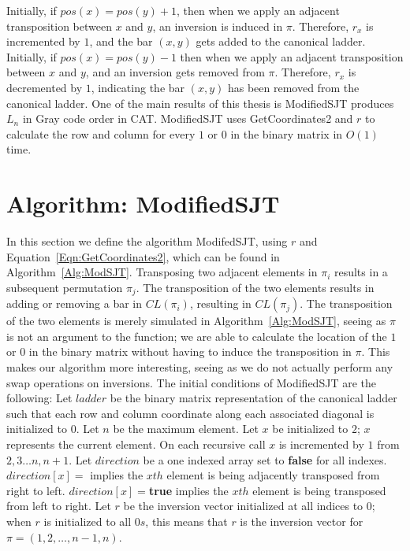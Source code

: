 Initially, if $pos(x)=pos(y)+1$, then when we apply an adjacent transposition between $x$ and $y$, 
an inversion is induced in $\pi$. Therefore, $r_{x}$ is incremented by $1$, and the bar $(x,y)$ gets 
added to the canonical ladder. Initially, if $pos(x)=pos(y)-1$ then when we apply an adjacent 
transposition between $x$ and $y$, and an inversion gets removed from $\pi$. Therefore, $r_{x}$
is decremented by $1$, indicating the bar 
$(x,y)$ has been removed from the canonical ladder.
One of the main results of this thesis is {\sc ModifiedSJT} produces $L_{n}$ in Gray code order in CAT. 
{\sc ModifiedSJT} uses {\sc GetCoordinates2} and $r$ to calculate the row and column for every $1$ 
or $0$ in the binary matrix in $O(1)$ time.

\section{Algorithm: ModifiedSJT}
In this section we define the algorithm {\sc ModifedSJT}, using $r$ and Equation~\ref{Eqn:GetCoordinates2}, 
which can be found in Algorithm~\ref{Alg:ModSJT}. Transposing two adjacent elements in $\pi_{i}$ results 
in a subsequent permutation $\pi_{j}$. The transposition of the two elements results in adding or removing a bar in 
$CL(\pi_{i})$, resulting in $CL(\pi_{j})$. The transposition of the two elements is merely simulated in Algorithm~\ref{Alg:ModSJT}, seeing 
as $\pi$ is not an argument to the function; we are able to calculate the location of the $1$ or $0$ in the binary matrix without 
having to induce the transposition in $\pi$. This makes our algorithm more interesting, seeing as we do not actually 
perform any swap operations on inversions. 
The initial conditions of {\sc ModifiedSJT} are the following:  
Let $ladder$ be the binary matrix representation of the canonical ladder such that 
each row and column coordinate along each associated diagonal is initialized to $0$.
Let $n$ be the maximum element.
Let $x$ be initialized to $2$; $x$ represents the current element. 
 On each recursive call 
$x$ is incremented by $1$ from $2,3 \dots n,n+1$. 
Let $direction$ be a one indexed array set to \textbf{false} for all indexes. $direction[x]=$ implies the $xth$ element 
is being adjacently transposed 
from right to left. $direction[x]=$\textbf{true} implies the $xth$ element is being transposed from 
left to right. Let $r$ be the inversion vector initialized at all indices to $0$; when $r$ is initialized 
to all $0s$, this means that $r$ is the inversion vector for $\pi=(1,2, \dots, n-1,n)$.
